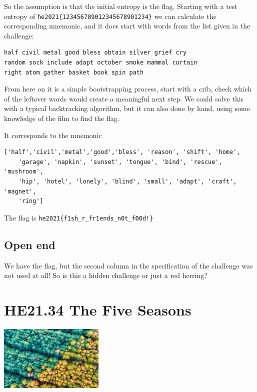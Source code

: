 \documentclass[english,a4paper,nols,noindent]{tufte-handout}
\begin{document}
So the assumption is that the initial entropy is the flag.  Starting with a test
entropy of \verb+he2021{123456789012345678901234}+ we can calculate the
corresponding mnemonic, and it does start with words from the list given in the
challenge:

\begin{verbatim} 
half civil metal good bless obtain silver grief cry
random sock include adapt october smoke mammal curtain 
right atom gather basket book spin path 
\end{verbatim}

From here on it is a simple bootstrapping process, start with a crib, check
which of the leftover words would create a meaningful next step.  We could solve
this with a typical backtracking algorithm, but it can also done by hand, using
some knowledge of the film to find the flag.

It corresponds to the mnemonic 
\begin{verbatim}
['half','civil','metal','good','bless', 'reason', 'shift', 'home',
    'garage', 'napkin', 'sunset', 'tongue', 'bind', 'rescue', 'mushroom',
    'hip', 'hotel', 'lonely', 'blind', 'small', 'adapt', 'craft', 'magnet',
    'ring']
\end{verbatim}

\noindent The flag is \verb+he2021{f1sh_r_fr1ends_n0t_f00d!}+

\subsection{Open end}
We have the flag, but the second column in the specification of the challenge
was not used at all!  So is this a hidden challenge or just a red herring?

\hypertarget{he21.34}{%
\section{HE21.34 The Five Seasons}
  \label{he21.34}}
\begin{marginfigure}
    \includegraphics[width=50mm]{images/challenge34.jpg}
\end{marginfigure}
\end{document}
